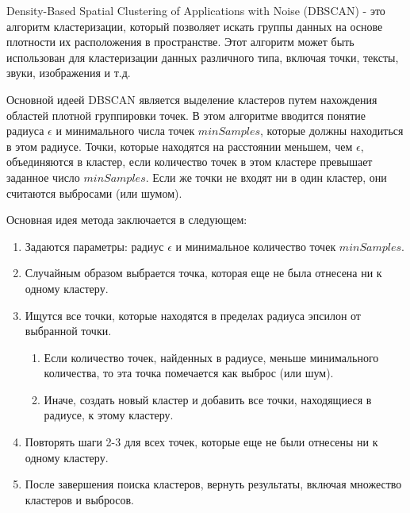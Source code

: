\documentclass{article}
\begin{document}
Density-Based Spatial Clustering of Applications with Noise (DBSCAN) - это алгоритм кластеризации, который позволяет искать группы данных на основе плотности их расположения в пространстве. Этот алгоритм может быть использован для кластеризации данных различного типа, включая точки, тексты, звуки, изображения и т.д.

Основной идеей DBSCAN является выделение кластеров путем нахождения областей плотной группировки точек. В этом алгоритме вводится понятие радиуса $\epsilon$ и минимального числа точек $minSamples$, которые должны находиться в этом радиусе. Точки, которые находятся на расстоянии меньшем, чем $\epsilon$, объединяются в кластер, если количество точек в этом кластере превышает заданное число $minSamples$. Если же точки не входят ни в один кластер, они считаются выбросами (или шумом).

Основная идея метода заключается в следующем:
\begin{enumerate}
\item Задаются параметры: радиус $\epsilon$ и минимальное количество точек $minSamples$.
\item Случайным образом выбрается точка, которая еще не была отнесена ни к одному кластеру.
\item Ищутся все точки, которые находятся в пределах радиуса эпсилон от выбранной точки.
\begin{enumerate}
\item Если количество точек, найденных в радиусе, меньше минимального количества, то эта точка помечается как выброс (или шум).
\item Иначе, создать новый кластер и добавить все точки, находящиеся в радиусе, к этому кластеру.
\end{enumerate}
\item Повторять шаги 2-3 для всех точек, которые еще не были отнесены ни к одному кластеру. 
\item После завершения поиска кластеров, вернуть результаты, включая множество кластеров и выбросов.
\end{enumerate}
\end{document}
